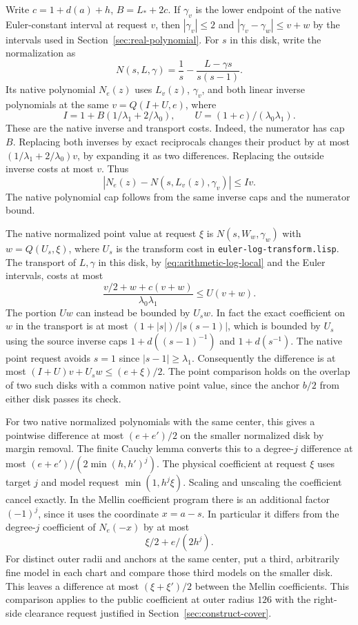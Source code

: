 \documentclass[11pt]{amsart}
\theoremstyle{definition}
\theoremstyle{remark}
\numberwithin{equation}{section}
\newcommand{\code}[1]{\nolinkurl{#1}}
\begin{document}
Write $c=1+d(a)+h$, $B=L_*+2c$. If $\gamma_v$ is the
lower endpoint of the native Euler-constant interval
at request $v$, then $|\gamma_v|\le2$ and
$|\gamma_v-\gamma_w|\le v+w$ by the intervals used in
Section~\ref{sec:real-polynomial}.
For $s$ in this disk, write the normalization as
\[
               N(s,L,\gamma)=\frac1s
                   -\frac{L-\gamma s}{s(s-1)} .
\]
Its native polynomial $N_e(z)$ uses $L_v(z)$, $\gamma_v$,
and both linear inverse polynomials at the same
$v=Q(I+U,e)$, where
\[
  I=1+B(1/\lambda_1+2/\lambda_0),\qquad
  U=(1+c)/(\lambda_0\lambda_1).
\]
These are the native inverse and transport costs.
Indeed, the numerator has cap $B$. Replacing both
inverses by exact reciprocals changes their product by
at most $(1/\lambda_1+2/\lambda_0)v$, by expanding
it as two differences. Replacing the outside inverse
costs at most $v$. Thus
\begin{equation}\label{eq:arithmetic-normalize}
        |N_e(z)-N(s,L_v(z),\gamma_v)|\le Iv .
\end{equation}
The native polynomial cap follows from the same
inverse caps and the numerator bound.

The native normalized point value at request $\xi$ is
$N(s,W_w,\gamma_w)$ with $w=Q(U_s,\xi)$, where $U_s$
is the transform cost in \code{euler-log-transform.lisp}.
The transport of $L,\gamma$ in this disk, by
\eqref{eq:arithmetic-log-local} and the Euler intervals,
costs at most
\[
      \frac{v/2+w+c(v+w)}{\lambda_0\lambda_1}\le U(v+w).
\]
The portion \(Uw\) can instead be bounded by \(U_s w\).
In fact the exact coefficient on \(w\) in the transport
is at most \((1+|s|)/|s(s-1)|\), which is bounded by
\(U_s\) using the source inverse caps
\(1+d((s-1)^{-1})\) and \(1+d(s^{-1})\).
The native point request avoids \(s=1\) since
\(|s-1|\ge\lambda_1\).
Consequently the difference is at most
\((I+U)v+U_s w\le(e+\xi)/2\). The point comparison
holds on the overlap of two such disks with a common
native point value, since the anchor \(b/2\) from
either disk passes its check.

For two native normalized polynomials with the same
center, this gives a pointwise difference at most
\((e+e')/2\) on the smaller normalized disk by
margin removal. The finite Cauchy lemma converts this
to a degree-$j$ difference at most
\((e+e')/(2\min(h,h')^j)\).
The physical coefficient at request $\xi$ uses target
$j$ and model request $\min(1,h^j\xi)$. Scaling and
unscaling the coefficient cancel exactly.
In the Mellin coefficient program there is an
additional factor $(-1)^j$, since it uses the
coordinate \(x=a-s\). In particular it differs from
the degree-$j$ coefficient of $N_e(-x)$ by at most
\begin{equation}\label{eq:arithmetic-physical}
                   \xi/2+e/(2h^j).
\end{equation}
For distinct outer radii and anchors at the same
center, put a third, arbitrarily fine model in each
chart and compare those third models on the
smaller disk. This leaves a difference at most
$(\xi+\xi')/2$ between the Mellin coefficients.
This comparison applies to the public coefficient
at outer radius \(126\) with the right-side
clearance request justified in
Section~\ref{sec:construct-cover}.
\end{document}
